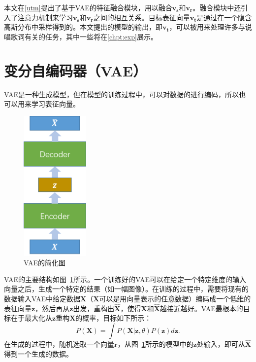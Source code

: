 本文在\ref{utm}提出了基于VAE的特征融合模块，用以融合$\bm {v_s}$和$\bm {v_r}$。融合模块中还引入了注意力机制来学习$\bm {v_s}$和$\bm {v_r}$之间的相互关系。目标表征向量$\bm {v_t}$是通过在一个隐含高斯分布中采样得到的。本文提出的模型的输出，即$\bm {v_t}$，可以被用来处理许多与说唱歌词有关的任务，其中一些将在\ref{chpt:exp}展示。\par

\section{变分自编码器（VAE）}
VAE是一种生成模型，但在模型的训练过程中，可以对数据的进行编码，所以也可以用来学习表征向量。\par
\begin{figure}[h]
  \centering
  \includegraphics[width=0.3\textwidth]{VAE.png}
  \caption{VAE的简化图}
  \label{fig:vae}
\end{figure}
VAE的主要结构如图~\ref{fig:vae}所示。一个训练好的VAE可以在给定一个特定维度的输入向量之后，生成一个特定的结果（如一幅图像）。在训练的过程中，需要将现有的数据输入VAE中给定数据$\bm X$（$\bm X$可以是用向量表示的任意数据）编码成一个低维的表征向量$\bm z$，然后再从$\bm z$出发，重构出$\bm{\hat X}$，使得$\bm X$和$\bm{\hat X}$越接近越好。VAE最根本的目标在于最大化从$\bm z$重构$\bm X$的概率，目标如下所示：
\begin{equation}
\label{eq:baseeq}
P(\bm X)=\int P(\bm X|\bm z, \theta)P(\bm z)d\bm z.
\end{equation}
在生成的过程中，随机选取一个向量$\bm r$，从图~\ref{fig:vae}所示的模型中的$\bm z$处输入，即可从$\bm{\hat X}$得到一个生成的数据。\par

